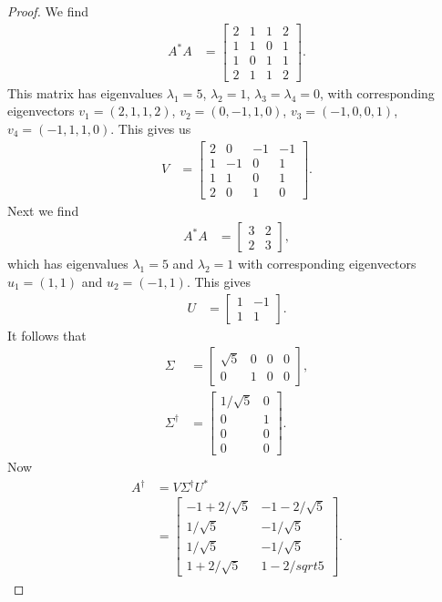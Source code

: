 \documentclass[leqno]{article}
\theoremstyle{nonumberplain}
\newtheorem{proof}{Proof}
\begin{document}
\begin{proof}
We find
\begin{align*}
A^*A&= 
\begin{bmatrix}
2 & 1 & 1 & 2\\
1 & 1 & 0 & 1\\
1 & 0 & 1 & 1\\
2 & 1 & 1 & 2
\end{bmatrix}.
\end{align*}
This matrix has eigenvalues $\lambda_1=5$, $\lambda_2=1$, $\lambda_3=\lambda_4=0$, with corresponding eigenvectors $v_1=(2,1,1,2)$, $v_2=(0,-1,1,0)$, $v_3=(-1,0,0,1)$, $v_4=(-1,1,1,0)$.  This gives us
\begin{align*}
V&=
\begin{bmatrix}
2 & 0 & -1 & -1\\
1 & -1 & 0 & 1\\
1 & 1 & 0 & 1\\
2 & 0 & 1 & 0
\end{bmatrix}.
\end{align*}
Next we find 
\begin{align*}
A^*A&=
\begin{bmatrix}
3 & 2\\
2 & 3
\end{bmatrix},
\end{align*}
which has eigenvalues $\lambda_1= 5$ and $\lambda_2=1$ with corresponding eigenvectors $u_1=(1,1)$ and $u_2=(-1,1)$. This gives
\begin{align*}
U&=
\begin{bmatrix}
1 & -1\\
1 & 1
\end{bmatrix}.
\end{align*}
It follows that 
\begin{align*}
\Sigma&=\begin{bmatrix}
\sqrt{5} & 0 & 0 & 0\\
0 & 1 & 0 & 0
\end{bmatrix}, \\
\Sigma^\dagger &=\begin{bmatrix}
1/\sqrt{5} & 0\\
0 & 1\\
0 & 0\\
0 & 0
\end{bmatrix}.
\end{align*}
Now 
\begin{align*}
A^\dagger&= V\Sigma^\dagger U^*\\
&=
\begin{bmatrix}
-1+2/\sqrt{5} & -1 - 2/\sqrt{5}\\
1/\sqrt{5} & -1/\sqrt{5}\\
1/\sqrt{5} & -1/\sqrt{5}\\
1+2/\sqrt{5} & 1-2/sqrt{5}
\end{bmatrix}.
\end{align*}
\end{proof}
\end{document}
